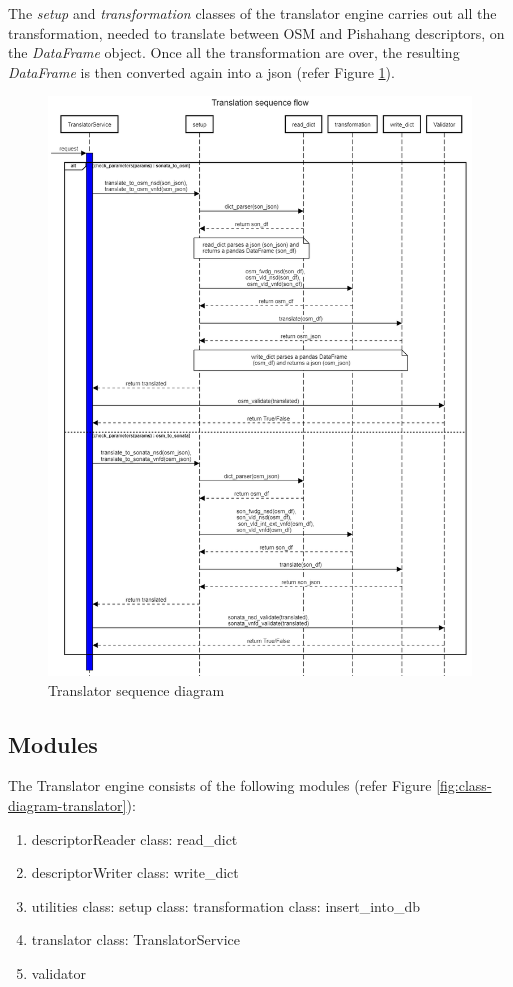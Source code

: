 The \textit{setup} and \textit{transformation} classes of the translator engine carries out all the transformation, needed to translate between OSM and Pishahang descriptors, on the \textit{DataFrame} object. Once all the transformation are over, the resulting \textit{DataFrame} is then converted again into a json (refer Figure  \ref{fig:sequence-diagram-translator}).

\begin{figure}[h!]
	\centering
	\includegraphics[width=1\linewidth]{"figures/translator_seq_diag"}
	\caption{Translator sequence diagram}
	\label{fig:sequence-diagram-translator}
\end{figure}


\subsection{Modules}
The Translator engine consists of the following modules (refer Figure  \ref{fig:class-diagram-translator}):
\begin{enumerate}
	\item descriptorReader
	\subitem class: read\_dict
	\item descriptorWriter
	\subitem class: write\_dict
	\item utilities
	\subitem class: setup
	\subitem class: transformation
	\subitem class: insert\_into\_db
	\item translator
	\subitem class: TranslatorService
	\item validator
	
\end{enumerate}

